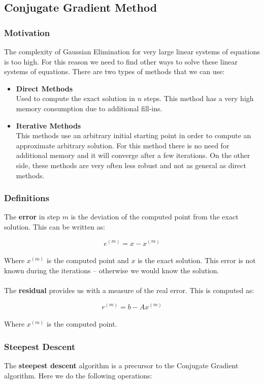 \documentclass{article}
\begin{document}
\subsection{Conjugate Gradient Method}
\subsubsection{Motivation}
The complexity of Gaussian Elimination for very large linear systems of equations is too high. For this reason we need to find other ways to solve these linear systems of equations. There are two types of methods that we can use:

\begin{itemize}
	\item \textbf{Direct Methods}
	\vspace{.2cm} \\
	Used to compute the exact solution in $n$ steps. This method has a very high memory consumption due to additional fill-ins.
	
	\item \textbf{Iterative Methods}
	\vspace{.2cm} \\
	This methods use an arbitrary initial starting point in order to compute an approximate arbitrary solution. For this method there is no need for additional memory and it will converge after a few iterations. On the other side, these methods are very often less robust and not as general as direct methods.
\end{itemize}

\subsubsection{Definitions}
The \textbf{error} in step $m$ is the deviation of the computed point from the exact solution. This can be written as:

\[ e^{(m)} = x-x^{(m)} \] \\
Where $x^{(m)}$ is the computed point and $x$ is the exact solution. This error is not known during the iterations -- otherwise we would know the solution. \\ \\
The \textbf{residual} provides us with a measure of the real error. This is computed as:

\[ r^{(m)} = b-Ax^{(m)} \] \\
Where $x^{(m)}$ is the computed point.

\subsubsection{Steepest Descent}
The \textbf{steepest descent} algorithm is a precursor to the Conjugate Gradient algorithm. Here we do the following operations:
\end{document}
